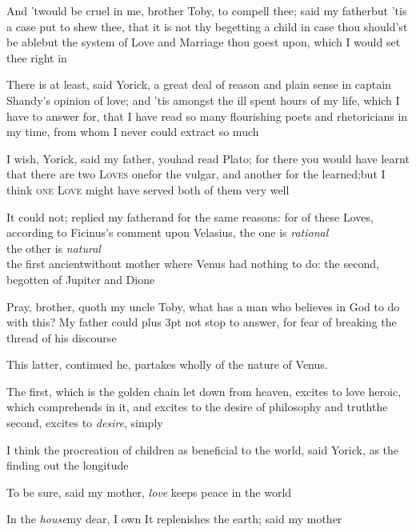 \documentclass{article}
\begin{document}
\tsh And ’twould be cruel in me, brother
Toby, to compell thee; said my father\tsk but ’tis a
case put to shew thee, that it is not thy begetting a
child\break
\tsk in case thou should’st be able\tsk but the
system of Love and Marriage thou goest upon, which I would set thee
right in\tsh

There is at least, said Yorick, a great deal of reason
and plain sense in captain Shandy’s opinion of love;
and ’tis amongst the ill spent hours of my life, which I have
to answer for, that I have read so many flourishing poets and
rhetoricians in my time, from whom I never could
extract so much\tsh\etp{}

I wish, Yorick, said my father, you\break had read
Plato; for there you would have learnt that there are two
\textsc{Loves}\tsk\break 
{}
one\tsk for the vulgar, and another for the
learned;\tsk but I think \textsc{one Love}
might have served both of them very well\tsk 

It could not; replied my father\tsk and for the same reasons:
for of these Loves, according to Ficinus’s comment
upon Velasius, the one is \textit{rational}\tsh\\
\null\quad\tsh the other is \textit{natural}\tsh \\
the first ancient\tsh without mother \tsh\break where
Venus had nothing to do: the second, begotten of
Jupiter and Dione\tsk

\tsh Pray, brother, quoth my uncle Toby, what
has a man who believes in God to do with this? My father could
\bgroup\parskip=3pt plus 3pt%
not
stop to answer, for fear of breaking the thread of his
discourse\tsh

This latter, continued he, partakes wholly of the nature of
Venus.

The first, which is the golden chain let down from heaven,
excites to love heroic, which comprehends in it, and excites to the
desire of philosophy and truth\tsh the second, excites to
\textit{desire}, simply\tsh

\tsh I think the procreation of children as beneficial
to the world, said Yorick, as the finding out the
longitude\tsh

\tsh To be sure, said my mother, \textit{love} keeps
peace in the world\tsh

\tsh In the \textit{house}\tsk my dear, I
own\tsk \break
\null\tsh It replenishes the earth; said my
mother\tsh
\end{document}
